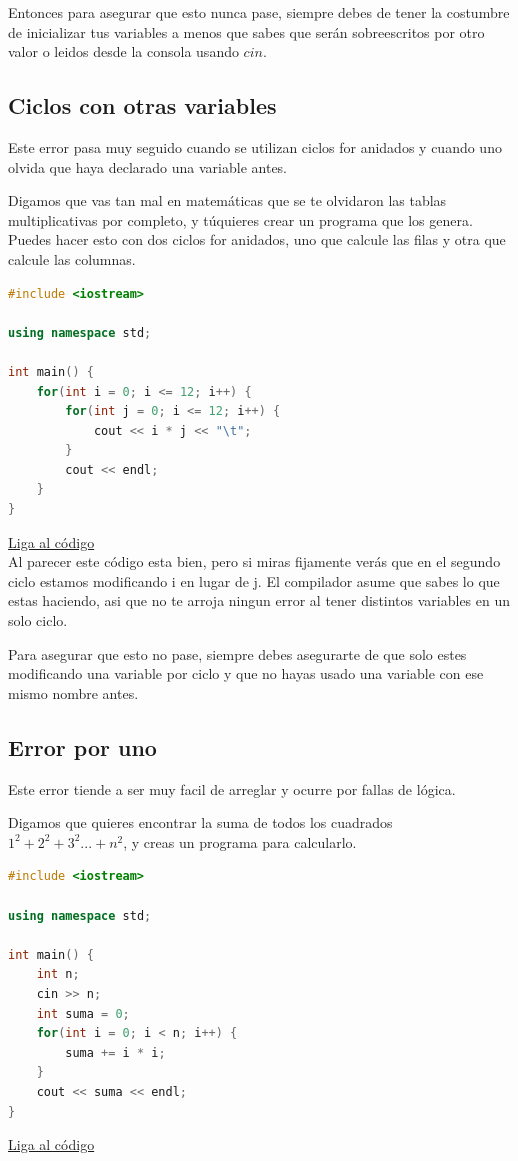 \documentclass{article}
\begin{document}
Entonces para asegurar que esto nunca pase, siempre debes de tener la costumbre de inicializar tus variables a menos que sabes que serán sobreescritos por otro valor o leidos desde la consola usando $cin$.

\subsection{Ciclos con otras variables}
Este error pasa muy seguido cuando se utilizan ciclos for anidados y cuando uno olvida que haya declarado una variable antes.

Digamos que vas tan mal en matemáticas que se te olvidaron las tablas multiplicativas por completo, y túquieres crear un programa que los genera. Puedes hacer esto con dos ciclos for anidados, uno que calcule las filas y otra que calcule las columnas.

\begin{lstlisting}[language=C++, title=Ciclos con otras variables]
#include <iostream>

using namespace std;

int main() {
	for(int i = 0; i <= 12; i++) {
		for(int j = 0; i <= 12; i++) {
			cout << i * j << "\t";
		}
		cout << endl;
	}
}
\end{lstlisting}
\href{https://repl.it/@Jamesscn/Tablas-de-Falsedad}{Liga al código}\\

Al parecer este código esta bien, pero si miras fijamente verás que en el segundo ciclo estamos modificando i en lugar de j. El compilador asume que sabes lo que estas haciendo, asi que no te arroja ningun error al tener distintos variables en un solo ciclo.

Para asegurar que esto no pase, siempre debes asegurarte de que solo estes modificando una variable por ciclo y que no hayas usado una variable con ese mismo nombre antes.

\subsection{Error por uno}
Este error tiende a ser muy facil de arreglar y ocurre por fallas de lógica.

Digamos que quieres encontrar la suma de todos los cuadrados $1^2 + 2^2 + 3^2 ... + n^2$, y creas un programa para calcularlo.

\begin{lstlisting}[language=C++, title=Error por uno]
#include <iostream>

using namespace std;

int main() {
	int n;
	cin >> n;
	int suma = 0;
	for(int i = 0; i < n; i++) {
		suma += i * i;
	}
	cout << suma << endl;
}
\end{lstlisting}
\href{https://repl.it/@Jamesscn/Sumás-Cuadrados}{Liga al código}\\
\end{document}
